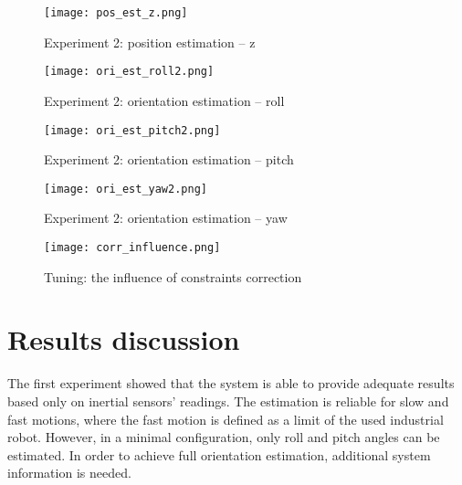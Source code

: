 \begin{figure}[p]
	\centering
	\texttt{[image: pos\_est\_z.png]}
	\caption{Experiment 2: position estimation -- z}
	\label{pos_est_z}
\end{figure}

\begin{figure}[p]
	\centering
	\texttt{[image: ori\_est\_roll2.png]}
	\caption{Experiment 2: orientation estimation -- roll}
	\label{ori_est_roll2}
\end{figure}

\begin{figure}[p]
	\centering
	\texttt{[image: ori\_est\_pitch2.png]}
	\caption{Experiment 2: orientation estimation -- pitch}
	\label{ori_est_pitch2}
\end{figure}


\begin{figure}[p]
	\centering
	\texttt{[image: ori\_est\_yaw2.png]}
	\caption{Experiment 2: orientation estimation -- yaw}
	\label{ori_est_yaw2}
\end{figure}


\begin{figure}[p]
	\centering
	\texttt{[image: corr\_influence.png]}
	\caption{Tuning: the influence of constraints correction}
	\label{corr_strength}
\end{figure}

\section{Results discussion}

The first experiment showed that the system is able to provide adequate results based only on inertial sensors' readings. The estimation is reliable for slow and fast motions, where the fast motion is defined as a limit of the used industrial robot. However, in a minimal configuration, only roll and pitch angles can be estimated. In order to achieve full orientation estimation, additional system information is needed.\\

